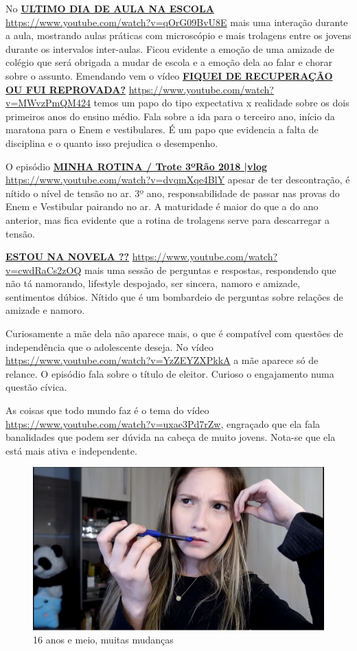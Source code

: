 No \href{https://www.youtube.com/watch?v=qOrG09BvU8E}{\textbf{ULTIMO DIA DE AULA NA ESCOLA}} \url{https://www.youtube.com/watch?v=qOrG09BvU8E} mais uma interação durante a aula, mostrando aulas práticas com microscópio e mais trolagens entre os jovens durante os intervalos inter-aulas. Ficou evidente a emoção de uma amizade de colégio que será obrigada a mudar de escola e a emoção dela ao falar e chorar sobre o assunto.
Emendando vem o vídeo \href{https://www.youtube.com/watch?v=MWvzPmQM424}{\textbf{FIQUEI DE RECUPERAÇÃO OU FUI REPROVADA?}} \url{https://www.youtube.com/watch?v=MWvzPmQM424} temos um papo do tipo expectativa x realidade sobre os dois primeiros anos do ensino médio. Fala sobre a ida para o terceiro ano, início da maratona para o Enem e vestibulares. É um papo que evidencia a falta de disciplina e o quanto isso prejudica o desempenho.

O episódio \href{https://www.youtube.com/watch?v=dvqmXqe4BlY}{\textbf{\textbf{MINHA ROTINA / Trote 3ºRão 2018 |vlog}}} \url{https://www.youtube.com/watch?v=dvqmXqe4BlY} apesar de ter descontração, é nítido o nível de tensão no ar. 3º ano, responsabilidade de passar nas provas do Enem e Vestibular pairando no ar. A maturidade é maior do que a do ano anterior, mas fica evidente que a rotina de trolagens serve para descarregar a tensão.


\href{https://www.youtube.com/watch?v=cwdRaCs2zOQ}{\textbf{ESTOU NA NOVELA ??}} \url{https://www.youtube.com/watch?v=cwdRaCs2zOQ} mais uma sessão de perguntas e respostas, respondendo que não tá namorando, lifestyle despojado, ser sincera, namoro e amizade, sentimentos dúbios. Nítido que é um bombardeio de perguntas sobre relações de amizade e namoro.

Curiosamente a mãe dela não aparece mais, o que é compatível com questões de independência que o adolescente deseja. No vídeo \url{https://www.youtube.com/watch?v=YzZEYZXPkkA} a mãe aparece só de relance. O episódio fala sobre o título de eleitor. Curioso o engajamento numa questão cívica.

As coisas que todo mundo faz é o tema do vídeo \url{https://www.youtube.com/watch?v=uxae3Pd7rZw}, engraçado que ela fala banalidades que podem ser dúvida na cabeça de muito jovens. Nota-se que ela está mais ativa e independente.

\begin{figure}[h!]
    \centering
    \includegraphics[width=0.7\linewidth]{fig/Zabetta-16-anos2}
    \caption{16 anos e meio, muitas mudanças}
    \label{fig:zabetta-16-anos2}
\end{figure}

